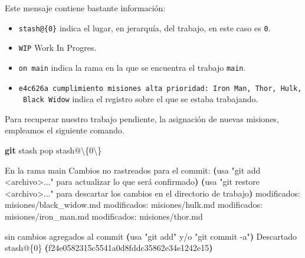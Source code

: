 \documentclass[
]{book}
\newenvironment{Shaded}{\begin{snugshade}}{\end{snugshade}}
\newcommand{\DataTypeTok}[1]{\textcolor[rgb]{0.13,0.29,0.53}{#1}}
\newcommand{\ErrorTok}[1]{\textcolor[rgb]{0.64,0.00,0.00}{\textbf{#1}}}
\newcommand{\ExtensionTok}[1]{#1}
\newcommand{\FunctionTok}[1]{\textcolor[rgb]{0.13,0.29,0.53}{\textbf{#1}}}
\newcommand{\KeywordTok}[1]{\textcolor[rgb]{0.13,0.29,0.53}{\textbf{#1}}}
\newcommand{\NormalTok}[1]{#1}
\newcommand{\StringTok}[1]{\textcolor[rgb]{0.31,0.60,0.02}{#1}}
\begin{document}
Este mensaje contiene bastante información:

\begin{itemize}
\item
  \texttt{stash@\{0\}} indica el lugar, en jerarquía, del trabajo, en este caso es \texttt{0}.
\item
  \texttt{WIP} Work In Progres.
\item
  \texttt{on\ main} indica la rama en la que se encuentra el trabajo \texttt{main}.
\item
  \texttt{e4c626a\ cumplimiento\ misiones\ alta\ prioridad:\ Iron\ Man,\ Thor,\ Hulk,\ Black\ Widow} indica el registro sobre el que se estaba trabajando.
\end{itemize}

Para recuperar nuestro trabajo pendiente, la asignación de nuevas misiones, empleamos el siguiente comando.

\begin{Shaded}
\begin{Highlighting}[]
\FunctionTok{git}\NormalTok{ stash pop stash@}\DataTypeTok{\textbackslash{}\{}\NormalTok{0}\DataTypeTok{\textbackslash{}\}}
\end{Highlighting}
\end{Shaded}

\begin{Shaded}
\begin{Highlighting}[]
\ExtensionTok{En}\NormalTok{ la rama main}
\ExtensionTok{Cambios}\NormalTok{ no rastreados para el commit:}
  \KeywordTok{(}\ExtensionTok{usa} \StringTok{"git add \textless{}archivo\textgreater{}..."}\NormalTok{ para actualizar lo que será confirmado}\KeywordTok{)}
  \KeywordTok{(}\ExtensionTok{usa} \StringTok{"git restore \textless{}archivo\textgreater{}..."}\NormalTok{ para descartar los cambios en el directorio de trabajo}\KeywordTok{)}
    \ExtensionTok{modificados:}\NormalTok{     misiones/black\_widow.md}
    \ExtensionTok{modificados:}\NormalTok{     misiones/hulk.md}
    \ExtensionTok{modificados:}\NormalTok{     misiones/iron\_man.md}
    \ExtensionTok{modificados:}\NormalTok{     misiones/thor.md}

\ExtensionTok{sin}\NormalTok{ cambios agregados al commit }\ErrorTok{(}\ExtensionTok{usa} \StringTok{"git add"}\NormalTok{ y/o }\StringTok{"git commit {-}a"}\KeywordTok{)}
\ExtensionTok{Descartado}\NormalTok{ stash@\{0\} }\ErrorTok{(}\ExtensionTok{f24e0582315c5541a0d8fddc35862e34e1242e15}\KeywordTok{)}
\end{Highlighting}
\end{Shaded}
\end{document}

